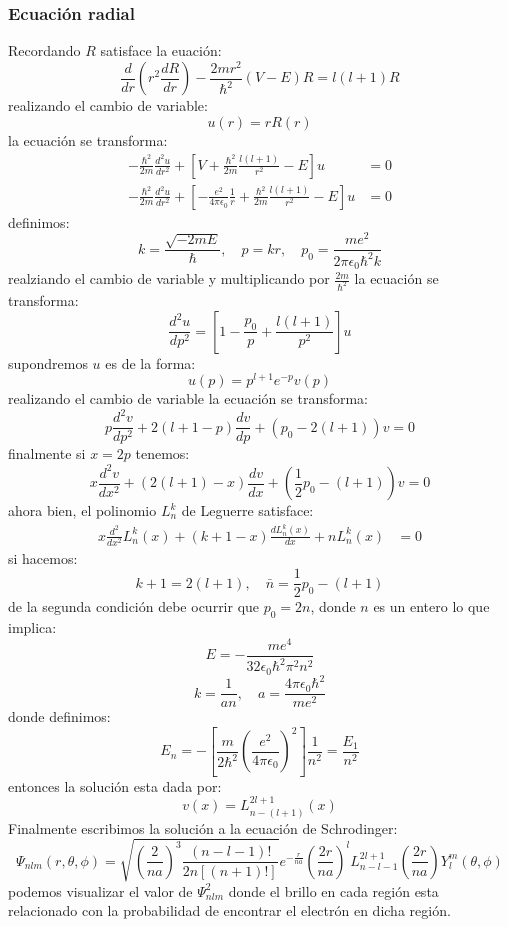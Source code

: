 \documentclass{article}
\begin{document}
\begin{tcolorbox}[breakable]
    \subsubsection*{Ecuación radial}
    Recordando $R$ satisface la euación:
    \[ \frac{d}{dr}\left( r^2\frac{dR}{dr} \right) - \frac{2mr^2}{\hbar^2}(V-E)R = l(l+1)R \]
    realizando el cambio de variable:
    \[ u(r) = rR(r) \]
    la ecuación se transforma:
    \begin{align*}
        -\frac{\hbar^2}{2m} \frac{d^2u}{dr^2} + \left[ V + \frac{\hbar^2}{2m}\frac{l(l+1)}{r^2} - E \right]u &= 0 \\ 
        -\frac{\hbar^2}{2m} \frac{d^2u}{dr^2} + \left[ -\frac{e^2}{4\pi \epsilon_0}\frac{1}{r} + \frac{\hbar^2}{2m}\frac{l(l+1)}{r^2} - E \right]u &= 0 
    \end{align*}
    definimos:
    \[ k = \frac{\sqrt{-2mE}}{\hbar},\quad p = kr,\quad p_0 = \frac{me^2}{2\pi \epsilon_0\hbar^2k} \]
    realziando el cambio de variable y multiplicando por $\frac{2m}{\hbar^2}$ la ecuación se transforma:
    \[ \frac{d^2u}{dp^2} = \left[ 1- \frac{p_0}{p} + \frac{l(l+1)}{p^2} \right]u \]
    supondremos $u$ es de la forma:
    \[ u(p) = p^{l+1}e^{-p}v(p) \]
    realizando el cambio de variable la ecuación se transforma:
    \[ p\frac{d^2v}{dp^2} + 2(l+1-p)\frac{dv}{dp} + (p_0-2(l+1))v = 0 \]
    finalmente si $x=2p$ tenemos:
    \[ x\frac{d^2v}{dx^2} + (2(l+1)-x)\frac{dv}{dx} + \left( \frac{1}{2}p_0 - (l+1) \right)v = 0 \]
    ahora bien, el polinomio $L_n^k$ de Leguerre satisface:
    \begin{align*}
        x\frac{d^2}{dx^2}L_n^k(x) + (k+1-x)\frac{dL_n^k(x)}{dx} + nL_n^k(x) &= 0
    \end{align*}
    si hacemos:
    \[ k+1 = 2(l+1),\quad \bar{n} = \frac{1}{2}p_0 -(l+1) \]
    de la segunda condición debe ocurrir que $p_0 = 2n$, donde $n$ es un entero lo que implica:
    \[ E = -\frac{me^4}{32 \epsilon_0\hbar^2 \pi^2 n^2} \]
    \[ k = \frac{1}{an}, \quad a = \frac{4\pi \epsilon_0\hbar^2}{me^2} \]
    donde definimos:
    \[ E_n = -\left[ \frac{m}{2\hbar^2}\left( \frac{e^2}{4\pi \epsilon_0} \right)^2 \right] \frac{1}{n^2} = \frac{E_1}{n^2} \]
    entonces la solución esta dada por:
    \[ v(x) = L^{2l+1}_{n-(l+1)}(x) \]
    Finalmente escribimos la solución a la ecuación de Schrodinger:
    \[ \Psi_{nlm}(r, \theta, \phi) = \sqrt{\left( \frac{2}{na} \right)^3 \frac{(n-l-1)!}{2n[(n+1)!]}}e^{-\frac{r}{na}} \left(\frac{2r}{na}\right)^l L_{n-l-1}^{2l+1} \left( \frac{2r}{na} \right) Y_{l}^m(\theta,\phi) \]
    podemos visualizar el valor de $\Psi_{nlm}^2$ donde el brillo en cada región esta relacionado con la probabilidad de encontrar el electrón en dicha región. 

\end{tcolorbox}
\end{document}
